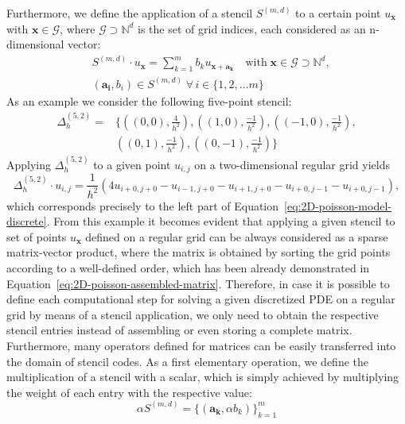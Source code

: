 Furthermore, we define the application of a stencil $S^{(m, d)}$ to a certain point $u_{\bm x}$ with $\bm x \in \mathcal G$, where $\mathcal G \supset \mathbb{N}^d$ is the set of grid indices, each considered as an n-dimensional vector:
\begin{equation}
	\begin{split}
		& S^{(m, d)} \cdot u_{\bm x} = \sum_{k=1}^m b_k u_{\bm x + \bm{a_k}} \quad 
		\text{with} \; \bm{x} \in \mathcal G \supset \mathbb{N}^d, \\ & (\bm{a_i}, b_i) \in S^{(m,d)} \; \forall \, i \in \{ 1, 2, \dots m \} 
	\end{split}
\end{equation}
As an example we consider the following five-point stencil:
\begin{equation}
	\begin{split}
		\Delta_h^{(5,2)} = & \bigg\{ \left( \left( 0,0 \right), \frac{4}{h^2}\right), \left(\left(1,0\right), \frac{-1}{h^2}\right), \left(\left(-1,0\right), \frac{-1}{h^2}\right), \\ & \left(\left(0,1\right), \frac{-1}{h^2}\right), \left(\left(0,-1\right), \frac{-1}{h^2}\right) \bigg\}
	\end{split}
	\label{eq:five-point-stencil}
\end{equation}
Applying $\Delta_{h}^{(5,2)}$ to a given point $u_{i,j}$ on a two-dimensional regular grid yields 
\begin{equation}
	\Delta_h^{(5,2)} \cdot u_{i,j} = \frac{1}{h^2} \left(4 u_{i+0,j+0}  - u_{i-1,j+0} - u_{i+1,j+0} - u_{i+0,j-1} - u_{i+0,j-1}\right),
\end{equation}
which corresponds precisely to the left part of Equation~\eqref{eq:2D-poisson-model-discrete}.
From this example it becomes evident that applying a given stencil to set of points $u_{\bm x}$ defined on a regular grid can be always considered as a sparse matrix-vector product, where the matrix is obtained by sorting the grid points according to a well-defined order, which has been already demonstrated in Equation~\eqref{eq:2D-poisson-assembled-matrix}.
Therefore, in case it is possible to define each computational step for solving a given discretized PDE on a regular grid by means of a stencil application, we only need to obtain the respective stencil entries instead of assembling or even storing a complete matrix.
Furthermore, many operators defined for matrices can be easily transferred into the domain of stencil codes.
As a first elementary operation, we define the multiplication of a stencil with a scalar, which is simply achieved by multiplying the weight of each entry with the respective value:
\begin{equation}
	\alpha S^{(m, d)} = \{(\bm{a_k}, \alpha b_k) \}_{k=1}^m
\end{equation}

